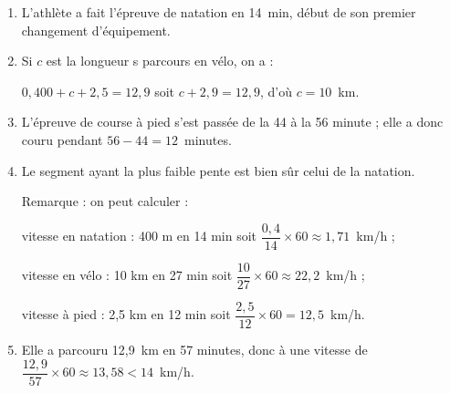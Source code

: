 \medskip
	
	\begin{enumerate}
		\item %
L'athlète a fait l'épreuve de natation en 14~min, début de son premier changement d'équipement.	
		\item %
Si $c$ est la longueur s parcours en vélo, on a :
		
$0,400 + c + 2,5 = 12,9$ soit $c + 2,9 = 12,9$, d'où $c = 10$~km.		
		\item %
L'épreuve de course à pied s'est passée de la 44 à la 56 minute ; elle a donc couru pendant $56 - 44 = 12$~minutes.		
		\item %
Le segment ayant la plus faible pente est bien sûr celui de la natation.

Remarque : on peut calculer :

vitesse en natation : 400 m en 14 min soit $\dfrac{0,4}{14}\times 60 \approx 1,71$~km/h ;

vitesse en vélo : 10 km en 27 min soit $\dfrac{10}{27}\times 60 \approx 22,2$~km/h ;

vitesse à pied : 2,5 km en 12 min soit $\dfrac{2,5}{12}\times 60 = 12,5$~km/h.		
		\item %
		
Elle a parcouru 12,9~km en  57 minutes, donc à une vitesse de $\dfrac{12,9}{57}\times 60 \approx 13,58 < 14$~km/h.
	\end{enumerate}
	
\bigskip
	
